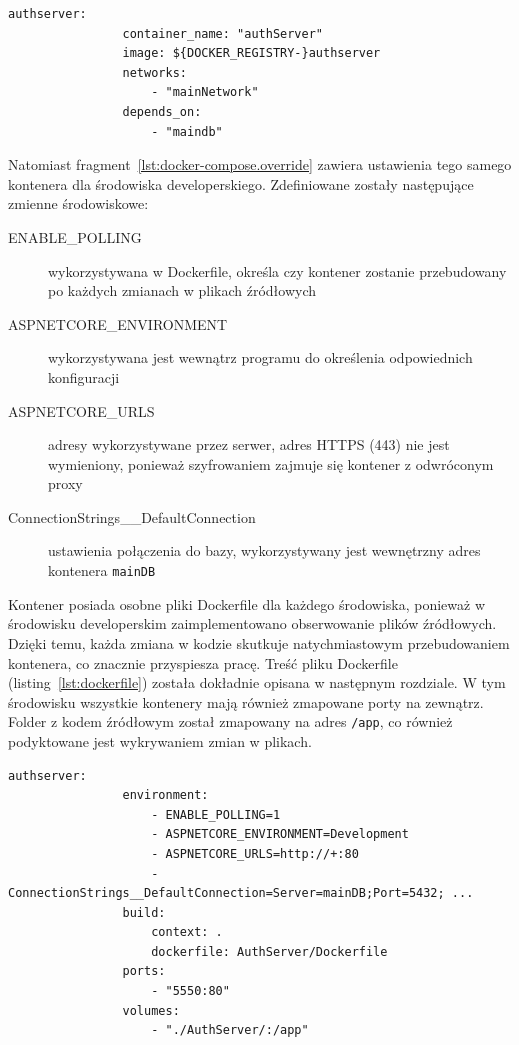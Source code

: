 		\begin{lstlisting}[label=lst:docker-compose,caption=Wspólne ustawienia kontenera authServer]
			authserver:
				container_name: "authServer"
				image: ${DOCKER_REGISTRY-}authserver
				networks:
					- "mainNetwork"
				depends_on:
					- "maindb"
		\end{lstlisting}

		Natomiast fragment~\ref{lst:docker-compose.override} zawiera ustawienia tego samego kontenera dla środowiska developerskiego.
		Zdefiniowane zostały następujące zmienne środowiskowe:
		\begin{description}
			\item[ENABLE\_POLLING] wykorzystywana w Dockerfile, określa czy kontener zostanie przebudowany po każdych zmianach w plikach źródłowych
			\item[ASPNETCORE\_ENVIRONMENT] wykorzystywana jest wewnątrz programu do określenia odpowiednich konfiguracji
			\item[ASPNETCORE\_URLS] adresy wykorzystywane przez serwer, adres HTTPS (443) nie jest wymieniony, ponieważ szyfrowaniem zajmuje się kontener z odwróconym proxy
			\item[ConnectionStrings\_\_DefaultConnection] ustawienia połączenia do bazy, wykorzystywany jest wewnętrzny adres kontenera \verb|mainDB|
		\end{description}
		Kontener posiada osobne pliki Dockerfile dla każdego środowiska, ponieważ w środowisku developerskim zaimplementowano obserwowanie plików źródłowych.
		Dzięki temu, każda zmiana w kodzie skutkuje natychmiastowym przebudowaniem kontenera, co znacznie przyspiesza pracę.
		Treść pliku Dockerfile (listing~\ref{lst:dockerfile}) została dokładnie opisana w następnym rozdziale.
		W tym środowisku wszystkie kontenery mają również zmapowane porty na zewnątrz.
		Folder z kodem źródłowym został zmapowany na adres \verb|/app|, co również podyktowane jest wykrywaniem zmian w plikach.

		\begin{lstlisting}[label=lst:docker-compose.override,caption=Ustawienia kontenera authServer dla środowiska developerskiego]
			authserver:
				environment:
					- ENABLE_POLLING=1
					- ASPNETCORE_ENVIRONMENT=Development
					- ASPNETCORE_URLS=http://+:80
					- ConnectionStrings__DefaultConnection=Server=mainDB;Port=5432; ...
				build:
					context: .
					dockerfile: AuthServer/Dockerfile
				ports:
					- "5550:80"
				volumes:
					- "./AuthServer/:/app"
		\end{lstlisting}

